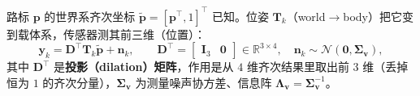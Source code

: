 \begin{definition}[载体系点观测模型]\label{def:pc-track-obs}
路标 $\mathbf{p}$ 的世界系齐次坐标 $\tilde{\mathbf{p}}=[\mathbf{p}^\top,1]^\top$ 已知。位姿 $\mathbf{T}_k$（world$\to$body）把它变到载体系，传感器测其前三维（位置）：
\begin{equation}
  \mathbf{y}_k=\mathbf{D}^\top\mathbf{T}_k\tilde{\mathbf{p}}+\mathbf{n}_k,\qquad
  \mathbf{D}^\top=\begin{bmatrix}\mathbf{I}_3 & \mathbf{0}\end{bmatrix}\in\mathbb{R}^{3\times4},\quad
  \mathbf{n}_k\sim\mathcal{N}(\mathbf{0},\boldsymbol{\Sigma}_{\mathbf v}),
  \label{eq:pc-track-obs}
\end{equation}
其中 $\mathbf{D}^\top$ 是\textbf{投影（dilation）矩阵}，作用是从 $4$ 维齐次结果里取出前 $3$ 维（丢掉恒为 $1$ 的齐次分量），$\boldsymbol{\Sigma}_{\mathbf v}$ 为测量噪声协方差、信息阵 $\boldsymbol{\Lambda}_{\mathbf v}=\boldsymbol{\Sigma}_{\mathbf v}^{-1}$。
\end{definition}

